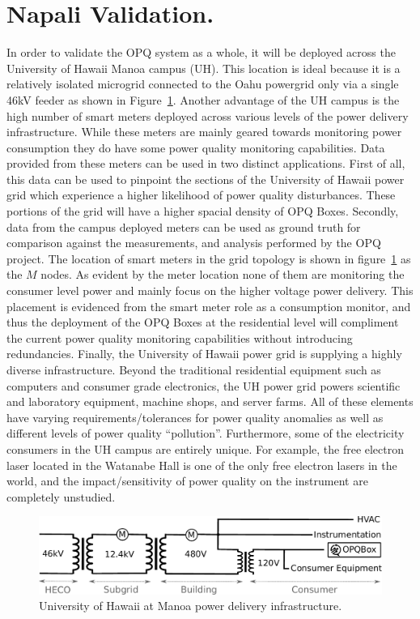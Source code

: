 \section{Napali Validation.}\label{sec:napali-validation.}
In order to validate the OPQ system as a whole, it will be deployed across the University of Hawaii Manoa campus (UH).
This location is ideal because it is a relatively isolated microgrid connected to the Oahu powergrid only via a single 46kV feeder as shown in Figure~\ref{expdes:fig:1}.
Another advantage of the UH campus is the high number of smart meters deployed across various levels of the power delivery infrastructure.
While these meters are mainly geared towards monitoring power consumption they do have some power quality monitoring capabilities.
Data provided from these meters can be used in two distinct applications.
First of all, this data can be used to pinpoint the sections of the University of Hawaii power grid which experience a higher likelihood of power quality disturbances.
These portions of the grid will have a higher spacial density of OPQ Boxes.
Secondly, data from the campus deployed meters can be used as ground truth for comparison against the measurements, and analysis performed by the OPQ project.
The location of smart meters in the grid topology is shown in figure~\ref{expdes:fig:1} as the $M$ nodes.
As evident by the meter location none of them are monitoring the consumer level power and mainly focus on the higher voltage power delivery.
This placement is evidenced from the smart meter role as a consumption monitor, and thus the deployment of the OPQ Boxes at the residential level will compliment the current power quality monitoring capabilities without introducing redundancies.
Finally, the University of Hawaii power grid is supplying a highly diverse infrastructure.
Beyond the traditional residential equipment such as computers and consumer grade electronics, the UH power grid powers scientific and laboratory equipment, machine shops, and server farms.
All of these elements have varying requirements/tolerances for power quality anomalies as well as different levels of power quality ``pollution''.
Furthermore, some of the electricity consumers in the UH campus are entirely unique.
For example, the free electron laser located in the Watanabe Hall is one of the only free electron lasers in the world, and the impact/sensitivity of power quality on the instrument are completely unstudied.
\begin{figure}[h]
	\centering
	\includegraphics[width=1\linewidth]{img/uh-grid.pdf}	
	\caption{University of Hawaii at Manoa power delivery infrastructure.}
	\label{expdes:fig:1}
\end{figure}

